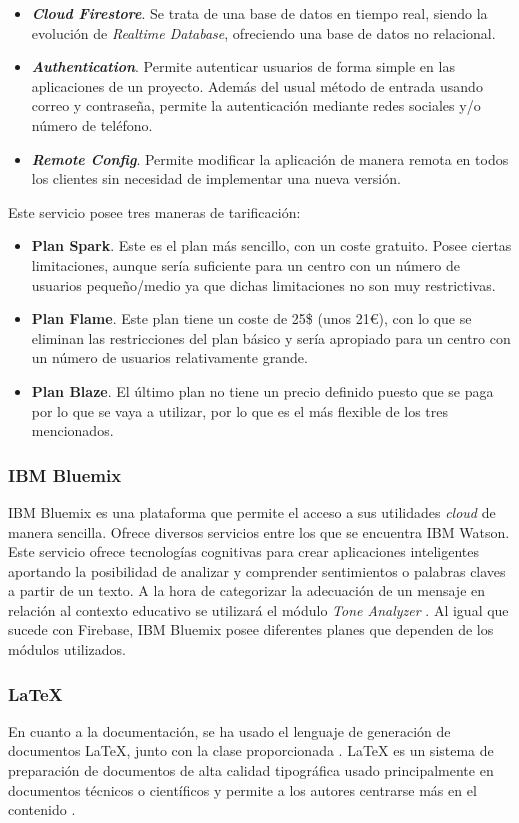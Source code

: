 \begin{itemize}
	\item \textbf{\textit{Cloud Firestore}}. Se trata de una base de datos en tiempo real, siendo la evolución de \textit{Realtime Database}, ofreciendo una base de datos no relacional.
	\item \textbf{\textit{Authentication}}. Permite autenticar usuarios de forma simple en las aplicaciones de un proyecto. Además del usual método de entrada usando correo y contraseña, permite la autenticación mediante redes sociales y/o número de teléfono.
	\item \textbf{\textit{Remote Config}}. Permite modificar la aplicación de manera remota en todos los clientes sin necesidad de implementar una nueva versión.
\end{itemize}

Este servicio posee tres maneras de tarificación:

\begin{itemize}
	\item \textbf{Plan Spark}. Este es el plan más sencillo, con un coste gratuito. Posee ciertas limitaciones, aunque sería suficiente para un centro con un número de usuarios pequeño/medio ya que dichas limitaciones no son muy restrictivas.
	\item \textbf{Plan Flame}. Este plan tiene un coste de 25\$ (unos 21\euro{}), con lo que se eliminan las restricciones del plan básico y sería apropiado para un centro con un número de usuarios relativamente grande.
	\item \textbf{Plan Blaze}. El último plan no tiene un precio definido puesto que se paga por lo que se vaya a utilizar, por lo que es el más flexible de los tres mencionados.
\end{itemize}

\subsubsection*{IBM Bluemix}
IBM Bluemix es una plataforma que permite el acceso a sus utilidades \textit{cloud} de manera sencilla. Ofrece diversos servicios entre los que se encuentra IBM Watson. Este servicio ofrece tecnologías cognitivas para crear aplicaciones inteligentes aportando la posibilidad de analizar y comprender sentimientos o palabras claves a partir de un texto. A la hora de categorizar la adecuación de un mensaje en relación al contexto educativo se utilizará el módulo \textit{Tone Analyzer} \cite{IBM}. Al igual que sucede con Firebase, IBM Bluemix posee diferentes planes que dependen de los módulos utilizados.

\subsubsection*{LaTeX}
En cuanto a la documentación, se ha usado el lenguaje de generación de documentos LaTeX, junto con la clase \esitfg{} proporcionada \cite{ARCO}. LaTeX es un sistema de preparación de documentos de alta calidad tipográfica usado principalmente en documentos técnicos o científicos y permite a los autores centrarse más en el contenido \cite{TheLatexProject}.
